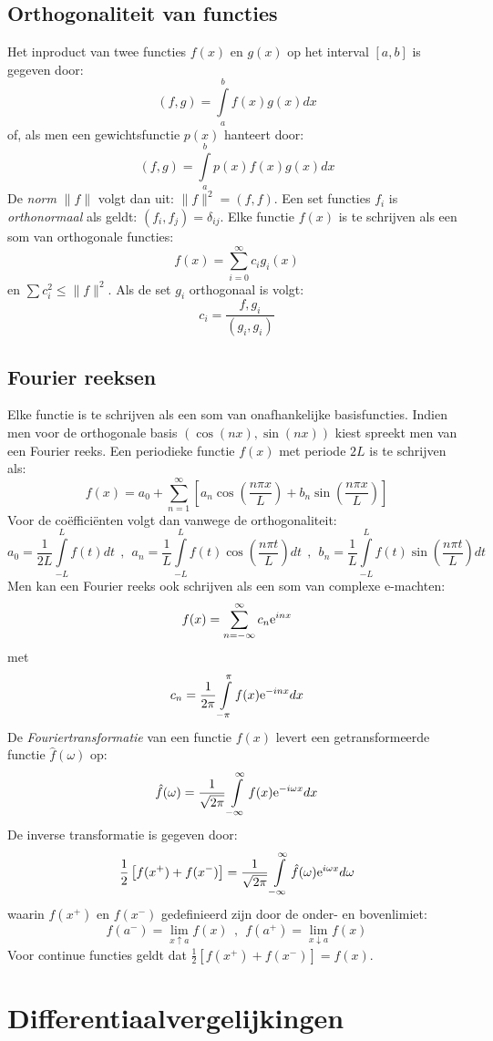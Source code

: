 \section{Orthogonaliteit van functies}
Het inproduct van twee functies $f(x)$ en $g(x)$ op het interval $[a,b]$ is
gegeven door:
\[
(f,g)=\int\limits_a^bf(x)g(x)dx
\]
of, als men een gewichtsfunctie $p(x)$ hanteert door:
\[
(f,g)=\int\limits_a^bp(x)f(x)g(x)dx
\]
De {\it norm} $\|f\|$ volgt dan uit: $\|f\|^2=(f,f)$. Een set functies $f_i$
is {\it orthonormaal} als geldt: $(f_i,f_j)=\delta_{ij}$.
\npar
Elke functie $f(x)$ is te schrijven als een som van orthogonale functies:
\[
f(x)=\sum_{i=0}^\infty c_ig_i(x)
\]
en $\sum c_i^2\leq\|f\|^2$. Als de set $g_i$ orthogonaal is volgt:
\[
c_i=\frac{f,g_i}{(g_i,g_i)}
\]

\section{Fourier reeksen}
Elke functie is te schrijven als een som van onafhankelijke basisfuncties.
Indien men voor de orthogonale basis $(\cos(nx),\sin(nx))$ kiest spreekt men
van een Fourier reeks.
\npar
Een periodieke functie $f(x)$ met periode $2L$ is te schrijven als:
\[
f(x)=a_0+\sum_{n=1}^\infty\left[a_n\cos\left(\frac{n\pi x}{L}\right)+b_n\sin\left(\frac{n\pi x}{L}\right)\right]
\]
Voor de co\"effici\"enten volgt dan vanwege de orthogonaliteit:
\[
a_0=\frac{1}{2L}\int\limits_{-L}^Lf(t)dt~~,~~
a_n=\frac{1}{L}\int\limits_{-L}^Lf(t)\cos\left(\frac{n\pi t}{L}\right)dt~~,~~
b_n=\frac{1}{L}\int\limits_{-L}^Lf(t)\sin\left(\frac{n\pi t}{L}\right)dt
\]
Men kan een Fourier reeks ook schrijven als een som van complexe e-machten:
\[
f(x)=\sum_{n=-\infty}^\infty c_n{\rm e}^{inx}
\]
met
\[
c_n=\frac{1}{2\pi}\int\limits_{-\pi}^\pi f(x){\rm e}^{-inx}dx
\]
De {\it Fouriertransformatie} van een functie $f(x)$ levert een
getransformeerde functie $\hat{f}(\omega)$ op:
\[
\hat{f}(\omega)=\frac{1}{\sqrt{2\pi}}\int\limits_{-\infty}^\infty f(x){\rm e}^{-i\omega x}dx
\]
De inverse transformatie is gegeven door:
\[
\frac{1}{2}\left[f(x^+)+f(x^-)\right]=\frac{1}{\sqrt{2\pi}}\int\limits_{-\infty}^\infty\hat{f}(\omega){\rm e}^{i\omega x}d\omega
\]
waarin $f(x^+)$ en $f(x^-)$ gedefinieerd zijn door de onder- en bovenlimiet:
\[
f(a^-)=\lim_{x\uparrow a}f(x)~~,~~f(a^+)=\lim_{x\downarrow a}f(x)
\]
Voor continue functies geldt dat $\frac{1}{2}\left[f(x^+)+f(x^-)\right]=f(x)$.

\chapter{Differentiaalvergelijkingen}
